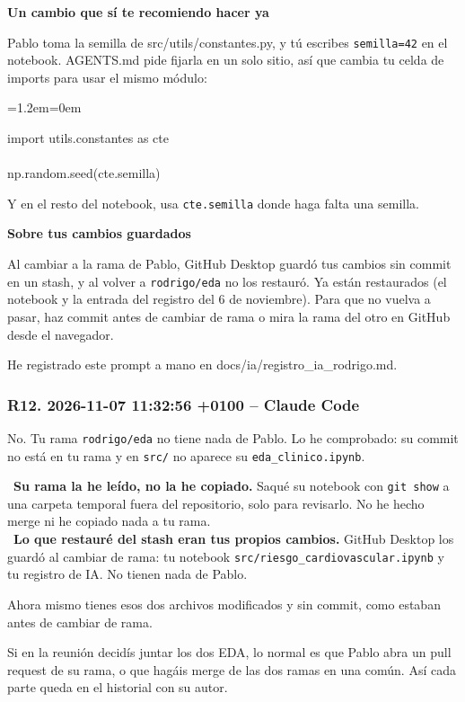 \documentclass[11pt,a4paper]{article}
\newenvironment{codigo}
  {\par\smallskip\begin{list}{}{\leftmargin=1.2em\rightmargin=0em}\item\relax\ttfamily\scriptsize\raggedright}
  {\end{list}\smallskip}
\begin{document}
{\textbf{Un cambio que sí te recomiendo hacer ya}

Pablo toma la semilla de src/\allowbreak{}utils/\allowbreak{}constantes.py, y tú escribes \texttt{semilla=42} en el notebook. AGENTS.md pide fijarla en un solo sitio, así que cambia tu celda de imports para usar el mismo módulo:

\begin{codigo}
import utils.constantes as cte \\{}
\mbox{} \\{}
np.random.seed(cte.semilla)
\end{codigo}
Y en el resto del notebook, usa \texttt{cte.semilla} donde haga falta una semilla.

\textbf{Sobre tus cambios guardados}

Al cambiar a la rama de Pablo, GitHub Desktop guardó tus cambios sin commit en un stash, y al volver a \texttt{rodrigo/\allowbreak{}eda} no los restauró. Ya están restaurados (el notebook y la entrada del registro del 6 de noviembre). Para que no vuelva a pasar, haz commit antes de cambiar de rama o mira la rama del otro en GitHub desde el navegador.

He registrado este prompt a mano en docs/\allowbreak{}ia/\allowbreak{}registro\_\allowbreak{}ia\_\allowbreak{}rodrigo.md.

}

\subsubsection*{R12. 2026-11-07 11:32:56 +0100 -- Claude Code}
{\small
No. Tu rama \texttt{rodrigo/\allowbreak{}eda} no tiene nada de Pablo. Lo he comprobado: su commit no está en tu rama y en \texttt{src/\allowbreak{}} no aparece su \texttt{eda\_\allowbreak{}clinico.ipynb}.

\hspace*{1.0em}\textbullet~\textbf{Su rama la he leído, no la he copiado.} Saqué su notebook con \texttt{git show} a una carpeta temporal fuera del repositorio, solo para revisarlo. No he hecho merge ni he copiado nada a tu rama. \\{}
\hspace*{1.0em}\textbullet~\textbf{Lo que restauré del stash eran tus propios cambios.} GitHub Desktop los guardó al cambiar de rama: tu notebook \texttt{src/\allowbreak{}riesgo\_\allowbreak{}cardiovascular.ipynb} y tu registro de IA. No tienen nada de Pablo.

Ahora mismo tienes esos dos archivos modificados y sin commit, como estaban antes de cambiar de rama.

Si en la reunión decidís juntar los dos EDA, lo normal es que Pablo abra un pull request de su rama, o que hagáis merge de las dos ramas en una común. Así cada parte queda en el historial con su autor.

}
\end{document}
